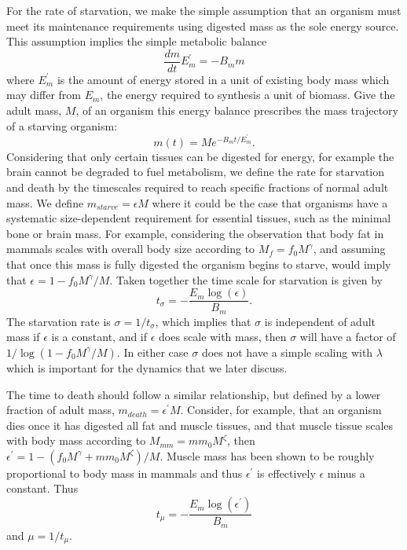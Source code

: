\documentclass[12pt,english]{article}
\begin{document}
\begin{spacing}{1.9}
For the rate of starvation, we make the simple assumption that an organism must meet its maintenance requirements using digested mass as the sole energy source. This assumption implies the simple metabolic balance 
\begin{equation}
\frac{dm}{dt}E_{m}^{\prime}=-B_{m}m
\end{equation}
where $E_{m}^{\prime}$ is the amount of energy stored in a unit of existing body mass which may differ from  $E_{m}$, the energy required to synthesis a unit of biomass. Give the adult mass, $M$, of an organism this energy balance prescribes the mass trajectory of a starving organism:
\begin{equation}
m\left(t\right)=Me^{-B_{m}t/E_{m}^{\prime}}.
\end{equation}
Considering that only certain tissues can be digested for energy, for example the brain cannot be degraded to fuel metabolism, we define the rate for starvation and death by the timescales required to reach specific fractions of normal adult mass. We define $m_{starve}=\epsilon M$ where it could be the case that organisms have a systematic size-dependent requirement for essential tissues, such as the minimal bone or brain mass. For example, considering the observation that body fat in mammals scales with overall body size according to $M_{f}=f_{0}M^{\gamma}$, and assuming that once this mass is fully digested the organism begins to starve, would imply that $\epsilon=1-f_{0}M^{\gamma}/M$. Taken together the time scale for starvation is given by
\begin{equation}
t_{\sigma}=-\frac{E_{m}\log\left(\epsilon\right)}{B_{m}}.
\end{equation}
The starvation rate is $\sigma=1/t_{\sigma}$, which implies that $\sigma$ is independent of adult mass if $\epsilon$ is a constant, and if $\epsilon$ does scale with mass, then $\sigma$ will have a factor of $1/\log\left(1-f_{0}M^{\gamma}/M\right)$. In either case $\sigma$ does not have a simple scaling with $\lambda$ which is important for the dynamics that we later discuss. 

The time to death should follow a similar relationship, but defined by a lower fraction of adult mass, $m_{death}=\epsilon^{\prime} M$. Consider, for example, that an organism dies once it has digested all fat and muscle tissues, and that muscle tissue scales with body mass according to $M_{mm}=mm_{0}M^{\zeta}$, then $\epsilon^{\prime}=1-\left(f_{0}M^{\gamma}+mm_{0}M^{\zeta}\right)/M$. Muscle mass has been shown to be roughly proportional to body mass \cite{muscle} in mammals and thus  $\epsilon^{\prime}$ is effectively $\epsilon$ minus a constant. Thus
\begin{equation}
t_{\mu}=-\frac{E_{m}\log\left(\epsilon^{\prime}\right)}{B_{m}}
\end{equation}
and $\mu=1/t_{\mu}$. 


\end{spacing}
\end{document}
